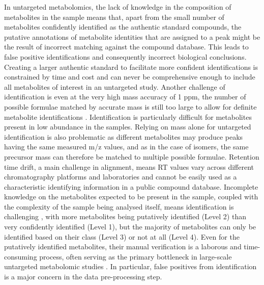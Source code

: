In untargeted metabolomics, the lack of knowledge in the composition of metabolites in the sample means that, apart from the small number of metabolites confidently identified as the authentic standard compounds, the putative annotations of metabolite identities that are assigned to a peak might be the result of incorrect matching against the compound database. This leads to false positive identifications and consequently incorrect biological conclusions. Creating a larger authentic standard to facilitate more confident identifications is constrained by time and cost and can never be comprehensive enough to include all metabolites of interest in an untargeted study. Another challenge of identification is even at the very high mass accuracy of 1 ppm, the number of possible formulae matched by accurate mass is still too large to allow for definite metabolite identifications \cite{Kind2006}. Identification is particularly difficult for metabolites present in low abundance in the samples. Relying on mass alone for untargeted identification is also problematic as different metabolites may produce peaks having the same measured m/z values, and as in the case of isomers, the same precursor mass can therefore be matched to multiple possible formulae. Retention time drift, a main challenge in alignment, means RT values vary across different chromatography platforms and laboratories and cannot be easily used as a characteristic identifying information in a public compound database. Incomplete knowledge on the metabolites expected to be present in the sample, coupled with the complexity of the sample being analysed itself, means identification is challenging \cite{Dunn2012}, with more metabolites being putatively identified (Level 2) than very confidently identified (Level 1), but the majority of metabolites can only be identified based on their class (Level 3) or not at all (Level 4). Even for the putatively identified metabolites, their manual verification is a laborous and time-consuming process, often serving as the primary bottleneck in large-scale untargeted metabolomic studies \cite{Dunn2012, DaSilva2015}. In particular, false positives from identification is a major concern in the data pre-processing step.

